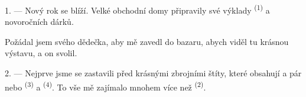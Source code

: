 %
%
%
%

\VUsaut{4.0mm}
\VUsaut{2.0mm}
\VUsaut{3.4mm}

1. --- Nový rok se blíží. Velké obchodní domy připravily své výklady 
\textsuperscript{(1)} a novoročních dárků.

Požádal jsem svého dědečka, aby mě zavedl do bazaru, abych viděl tu krásnou výstavu, a
on svolil.

2. --- Nejprve jsme se zastavili před krásnými zbrojními štíty, které obsahují
    a pár
 nebo   \textsuperscript{(3)} a
 \textsuperscript{(4)}. To vše mě zajímalo mnohem více než
 \textsuperscript{(2)}.

\VUsaut{3.0mm}
\VUsaut{2.6mm}

